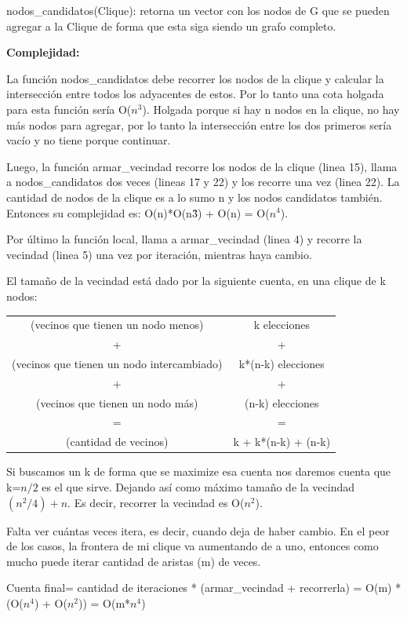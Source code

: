 nodos\_candidatos(Clique): retorna un vector con los nodos de G que se pueden agregar a la Clique de forma que esta siga siendo un grafo completo.

\textbf{Complejidad: }

La función nodos\_candidatos debe recorrer los nodos de la clique y calcular la intersección entre todos los adyacentes de estos. Por lo tanto una cota holgada para esta función sería O($n^3$). 
Holgada porque si hay n nodos en la clique, no hay más nodos para agregar, por lo tanto la intersección entre los dos primeros sería vacío y no tiene porque continuar.

Luego, la función armar\_vecindad recorre los nodos de la clique (linea 15), llama a nodos\_candidatos dos veces (lineas 17 y 22) y los recorre una vez (linea 22). 
La cantidad de nodos de la clique es a lo sumo n y los nodos candidatos también. Entonces su complejidad es: O(n)*O(n\^{3}) + O(n) = O($n^4$).

Por último la función local, llama a armar\_vecindad (linea 4) y recorre la vecindad (linea 5) una vez por iteración, mientras haya cambio.

El tamaño de la vecindad está dado por la siguiente cuenta, en una clique de k nodos:

\begin{center}
\begin{tabular}{  c  c  }
(vecinos que tienen un nodo menos) & k elecciones
\\ + & + \\ 
(vecinos que tienen un nodo intercambiado) & k*(n-k) elecciones
\\ + & + \\ 
(vecinos que tienen un nodo más) & (n-k) elecciones
\\ = & = \\
(cantidad de vecinos) & k + k*(n-k) + (n-k)
\end{tabular}
\end{center}

Si buscamos un k de forma que se maximize esa cuenta nos daremos cuenta que k=$n/2$ es el que sirve. Dejando así como máximo tamaño de la vecindad $(n^2/4) +n$. Es decir, recorrer la vecindad es O($n^2$).

Falta ver cuántas veces itera, es decir, cuando deja de haber cambio. En el peor de los casos, la frontera de mi clique va aumentando de a uno, entonces como mucho puede iterar cantidad de aristas (m) de veces.

Cuenta final= cantidad de iteraciones * (armar\_vecindad + recorrerla) = O(m) * (O($n^4$) + O($n^2$)) = O(m*$n^4$)

